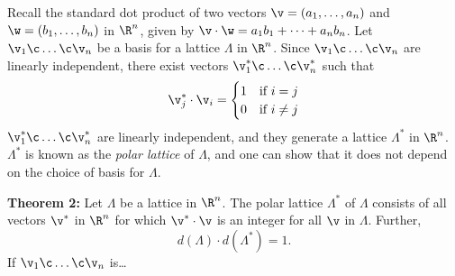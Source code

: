 Recall the standard dot product of two vectors $\v=(a_1,\dotsc,a_n)$ and $\w=(b_1,\dotsc,b_n)$ in $\R^n$, given by $\v\cdot \w=a_1b_1+\dotsb+a_nb_n$.  Let $\v_1\c \dotsc\c \v_n$ be a basis for a lattice $\Lambda$ in $\R^n$.  Since $\v_1\c \dotsc\c \v_n$ are linearly independent, there exist vectors $\v^*_1\c \dotsc\c \v^*_n$ such that
\[ \v^*_j \cdot \v_i = \begin{cases}
1 & \text{if $i=j$} \\
0 & \text{if $i\neq j$}
\end{cases} \]
$\v^*_1\c \dotsc\c \v^*_n$ are linearly independent, and they generate a lattice $\Lambda^*$ in $\R^n$.  $\Lambda^*$ is known as the \emph{polar lattice} of $\Lambda$, and one can show that it does not depend on the choice of basis for $\Lambda$.

\textbf{Theorem 2:}  Let $\Lambda$ be a lattice in $\R^n$.  The polar lattice $\Lambda^*$ of $\Lambda$ consists of all vectors $\v^*$ in $\R^n$ for which $\v^*\cdot \v$ is an integer for all $\v$ in $\Lambda$.  Further,
\[ d(\Lambda)\cdot d(\Lambda^*) = 1 . \]
\pf If $\v_1\c \dotsc\c \v_n$ is\ldots
